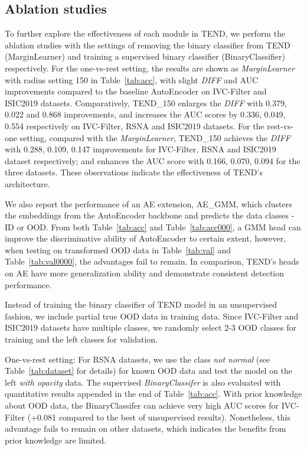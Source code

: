 \documentclass[12pt]{spieman}  %
\begin{document}
\begin{spacing}{2}
\subsection{Ablation studies}\label{ablation}
To further explore the effectiveness of each module in TEND, we perform the ablation studies with the settings of removing the binary classifier from TEND (MarginLearner) and training a supervised binary classifier (BinaryClassifier) respectively. For the one-vs-rest setting, the results are shown as \textit{MarginLearner} with radius setting 150 in Table~\ref{tab:acc}, with slight \textit{DIFF} and AUC improvements compared to the baseline AutoEncoder on IVC-Filter and ISIC2019 datasets. {Comparatively, TEND\_150 enlarges the \textit{DIFF} with 0.379, 0.022 and 0.868 improvements, and increases the AUC scores by 0.336, 0.049, 0.554 respectively on IVC-Filter, RSNA and ISIC2019 datasets. For the rest-vs-one setting, compared with the \textit{MarginLearner}, TEND\_150 achieves the \textit{DIFF} with 0.288, 0.109, 0.147 improvements for IVC-Filter, RSNA and ISIC2019 dataset respectively; and enhances the AUC score with 0.166, 0.070, 0.094 for the three datasets. These observations indicate the effectiveness of TEND's architecture.}

We also report the performance of an AE extension, AE\_GMM, which clusters the embeddings from the AutoEncoder backbone and predicts the data classes - ID or OOD. From both Table~\ref{tab:acc} and Table~\ref{tab:acc000}, a GMM head can improve the discriminative ability of AutoEncoder to certain extent, however, when testing on transformed OOD data in Table~\ref{tab:val} and Table~\ref{tab:val0000}, the advantages fail to remain. In comparison, TEND's heads on AE have more generalization ability and demonstrate consistent detection performance.

Instead of training the binary classifier of TEND model in an unsupervised fashion, we include partial true OOD data in training data. Since IVC-Filter and ISIC2019 datasets have multiple classes, we randomly select 2-3 OOD classes for training and the left classes for validation. 

One-vs-rest setting:
For RSNA datasets, we use the class \textit{not normal} (see Table~\ref{tab:dataset} for details) for known OOD data and test the model on the left \textit{with opacity} data. The supervised \textit{BinaryClassifer} is also evaluated with quantitative results appended in the end of Table~\ref{tab:acc}. {With prior knowledge about OOD data, the BinaryClassifer can achieve very high AUC scores for IVC-Filter (+0.081 compared to the best of unsupervised results). Nonetheless, this advantage fails to remain on other datasets, which indicates the benefits from prior knowledge are limited.} 


\end{spacing}
\end{document}
